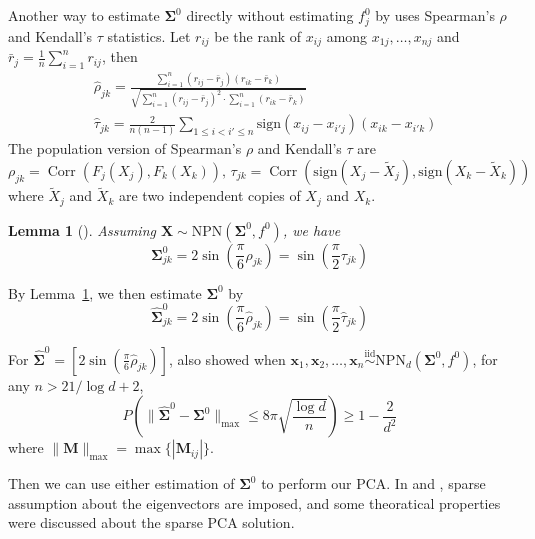 \documentclass{article}
\DeclareMathOperator{\Corr}{Corr}
\newtheorem{lemma}[theorem]{Lemma}
\theoremstyle{definition}
\begin{document}
	Another way to estimate $\bm \Sigma^0$ directly without estimating $f_j^0$ by \cite{liu2012nonparanormal} uses Spearman's $\rho$ and Kendall's $\tau$ statistics. Let $r_{ij}$ be the rank of $x_{ij}$ among $x_{1j}, \ldots, x_{nj}$ and $\bar{r}_j = \frac{1}{n} \sum_{i=1}^n r_{ij}$, then
	\begin{align*}
	&\hat{\rho}_{jk} = \frac{\sum_{i=1}^n (r_{ij} - \bar{r}_j)(r_{ik} - \bar{r}_k)}{\sqrt{\sum_{i=1}^n (r_{ij} - \bar{r}_j)^2 \cdot \sum_{i=1}^n (r_{ik} - \bar{r}_{k})}}\\
	&\hat{\tau}_{jk} = \frac{2}{n(n-1)} \sum_{1 \leq i < i' \leq n} \mathrm{sign}\left(x_{ij} - x_{i'j}\right)\left(x_{ik} - x_{i'k}\right)
	\end{align*}
	The population version of Spearman's $\rho$ and Kendall's $\tau$ are
	\[\rho_{jk} = \Corr(F_j(X_j), F_k(X_k)),\, \tau_{jk} = \Corr\left(\mathrm{sign}(X_j - \tilde{X}_j), \mathrm{sign}(X_k - \tilde{X}_k)\right)\]
	where $\tilde{X}_j$ and $\tilde{X}_k$ are two independent copies of $X_j$ and $X_k$.
	\begin{lemma}[\cite{liu2012nonparanormal}]\label{skeptic}
		Assuming $\bm X \sim \mathrm{NPN}(\bm \Sigma^0, f^0)$, we have
		\[\bm \Sigma_{jk}^0 = 2 \sin \left(\frac{\pi}{6} \rho_{jk}\right) = \sin \left(\frac{\pi}{2} \tau_{jk}\right)\]
	\end{lemma}
	By Lemma~\ref{skeptic}, we then estimate $\bm \Sigma^0$ by
	\[\hat{\bm \Sigma}^0_{jk} = 2 \sin \left(\frac{\pi}{6} \hat{\rho}_{jk}\right) = \sin\left(\frac{\pi}{2} \hat{\tau}_{jk}\right)\]

	For $\hat{\bm \Sigma}^0 = \left[2 \sin\left(\frac{\pi}{6} \hat{\rho}_{jk}\right)\right]$, \cite{han2014high} also showed when $\bm x_1, \bm x_2, \ldots, \bm x_n \overset{\mathrm{iid}}{\sim} \mathrm{NPN}_d(\bm \Sigma^0, f^0)$, for any $n > 21/{\log d} + 2$, 
	\[P\left(\|\hat{\bm \Sigma}^0 - \bm \Sigma^0\|_{\max} \leq 8 \pi \sqrt{\frac{\log d}{n}}\right) \geq 1 - \frac{2}{d^2}\]
	where $\|\bm M\|_{\max} = \max \{|\bm M_{ij}|\}$.

	Then we can use either estimation of $\bm \Sigma^0$ to perform our PCA. In \cite{han2014high} and \cite{han2013principal}, sparse assumption about the eigenvectors are imposed, and some theoratical properties were discussed about the sparse PCA solution. 
\end{document}
